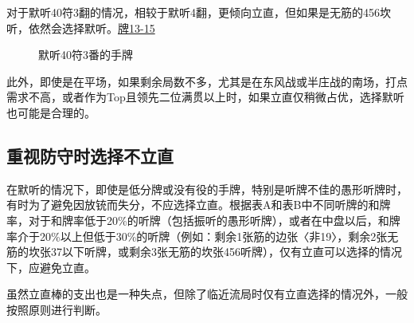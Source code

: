 对于默听40符3翻的情况，相较于默听4翻，更倾向立直，但如果是无筋的456坎听，依然会选择默听。\hyperref[lec2:pai13-15]{牌13-15}

\begin{figure}[h]
    \caption{默听40符3番的手牌}
    \label{lec2:pai13-15}
    \par\bigskip
    \par\bigskip
\end{figure}

此外，即使是在平场，如果剩余局数不多，尤其是在东风战或半庄战的南场，打点需求不高，或者作为Top且领先二位满贯以上时，如果立直仅稍微占优，选择默听也可能是合理的。

\subsection{重视防守时选择不立直}
在默听的情况下，即使是低分牌或没有役的手牌，特别是听牌不佳的愚形听牌时，有时为了避免因放铳而失分，不应选择立直。根据表A和表B中不同听牌的和牌率，对于和牌率低于20\%的听牌（包括振听的愚形听牌），或者在中盘以后，和牌率介于20\%以上但低于30\%的听牌（例如：剩余1张筋的边张〈非19〉，剩余2张无筋的坎张37以下听牌，或剩余3张无筋的坎张456听牌），仅有立直可以选择的情况下，应避免立直。

虽然立直棒的支出也是一种失点，但除了临近流局时仅有立直选择的情况外，一般按照原则进行判断。

